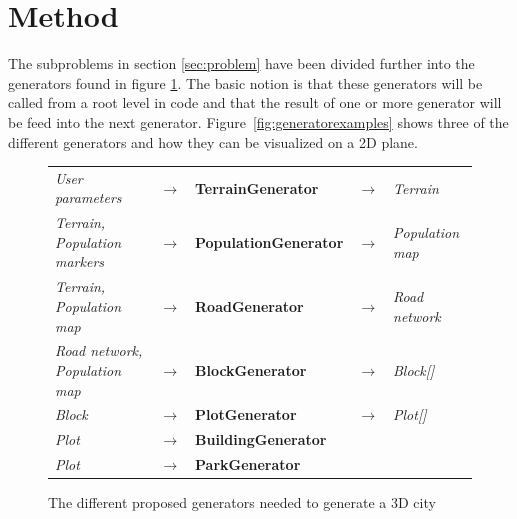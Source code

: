 \section{Method}
The subproblems in section \ref{sec:problem} have been divided further into the generators found in figure \ref{fig:generators}. 
The basic notion is that these generators will be called from a root level in code and that the result of one or more generator will be feed into the next generator.
Figure~\ref{fig:generatorexamples} shows three of the different generators and how they can be visualized on a 2D plane. 

\begin{center}
  \begin{figure}[H]
    \begin{center}
      \begin{table}[H]
        \begin{tabular}{lllll}
          \textit{User parameters}              & $\rightarrow$ & \textbf{TerrainGenerator}    & $\rightarrow$ & \textit{Terrain}        \\
          \textit{Terrain, Population markers}  & $\rightarrow$ & \textbf{PopulationGenerator} & $\rightarrow$ & \textit{Population map} \\
          \textit{Terrain, Population map}      & $\rightarrow$ & \textbf{RoadGenerator}       & $\rightarrow$ & \textit{Road network}   \\
          \textit{Road network, Population map} & $\rightarrow$ & \textbf{BlockGenerator}      & $\rightarrow$ & \textit{Block{[}{]}}    \\
          \textit{Block}                        & $\rightarrow$ & \textbf{PlotGenerator}       & $\rightarrow$ & \textit{Plot{[}{]}}     \\
          \textit{Plot}                         & $\rightarrow$ & \textbf{BuildingGenerator}   &               &                         \\
          \textit{Plot}                         & $\rightarrow$ & \textbf{ParkGenerator}       &               &                        
        \end{tabular}
      \end{table}
    \end{center}
    \caption[]{The different proposed generators needed to generate a 3D city}
    \label{fig:generators}
  \end{figure}
\end{center}

